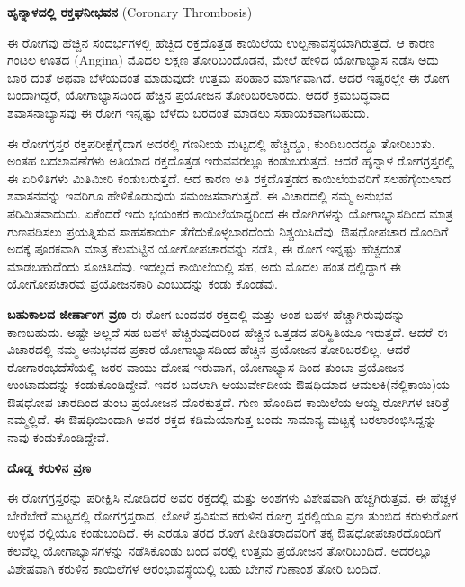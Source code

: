 \textbf{ಹೃನ್ನಾಳದಲ್ಲಿ ರಕ್ತಘನೀಭವನ} (Coronary Thrombosis)

ಈ ರೋಗವು ಹೆಚ್ಚಿನ ಸಂದರ್ಭಗಳಲ್ಲಿ ಹೆಚ್ಚಿದ ರಕ್ತದೊತ್ತಡ ಕಾಯಿಲೆಯ ಉಲ್ಬಣಾವಸ್ಥೆಯಾಗಿರುತ್ತದೆ. ಆ ಕಾರಣ ಗಂಟಲ ಊತದ (Angina) ಮೊದಲ ಲಕ್ಷಣ ತೋರಿಬಂದೊಡನೆ, ಮೇಲೆ ಹೇಳಿದ ಯೋಗಾಭ್ಯಾಸ ನಡೆಸಿ ಅದು ಬಾರ ದಂತೆ ಅಥವಾ ಬೆಳೆಯದಂತೆ ಮಾಡುವುದೇ ಉತ್ತಮ ಪರಿಹಾರ ಮಾರ್ಗವಾಗಿದೆ. ಆದರೆ ಇಷ್ಟರಲ್ಲೇ ಈ ರೋಗ ಬಂದಾಗಿದ್ದರೆ, ಯೋಗಾಭ್ಯಾಸದಿಂದ ಹೆಚ್ಚಿನ ಪ್ರಯೋಜನ ತೋರಿಬರಲಾರದು. ಆದರೆ ಕ್ರಮಬದ್ಧವಾದ ಶವಾಸನಾಭ್ಯಾಸವು ಈ ರೋಗ ಇನ್ನಷ್ಟು ಬೆಳೆದು ಬರದಂತೆ ಮಾಡಲು ಸಹಾಯಕವಾಗಬಹುದು.

ಈ ರೋಗಗ್ರಸ್ತರ ರಕ್ತಪರೀಕ್ಷೆಗೈದಾಗ ಅದರಲ್ಲಿ  ಗಣನೀಯ ಮಟ್ಟದಲ್ಲಿ ಹೆಚ್ಚಿದ್ದೂ,  ಕುಂದಿಬಂದದ್ದೂ ತೋರಿಬಂತು. ಅಂತಹ  ಬದಲಾವಣೆಗಳು ಅತಿಯಾದ ರಕ್ತದೊತ್ತಡ ಇರುವವರಲ್ಲೂ ಕಂಡುಬರುತ್ತದೆ. ಆದರೆ ಹೃನ್ನಾಳ ರೋಗಗ್ರಸ್ತರಲ್ಲಿ  ಈ ಏರಿಳಿತಿಗಳು ಮಿತಿಮೀರಿ ಕಂಡುಬರುತ್ತದೆ. ಆದ ಕಾರಣ ಅತಿ ರಕ್ತದೊತ್ತಡದ ಕಾಯಿಲೆಯವರಿಗೆ ಸಲಹೆಗೈಯಲಾದ ಶವಾಸನವನ್ನು ಇವರಿಗೂ ಹೇಳಿಕೊಡುವುದು ಸಮಂಜಸವಾಗುತ್ತದೆ. ಈ ವಿಚಾರದಲ್ಲಿ ನಮ್ಮ ಅನುಭವ ಪರಿಮಿತವಾದುದು. ಏಕೆಂದರೆ ಇದು ಭಯಂಕರ ಕಾಯಿಲೆಯಾದ್ದರಿಂದ ಈ ರೋಗಿಗಳನ್ನು ಯೋಗಾಭ್ಯಾಸದಿಂದ ಮಾತ್ರ ಗುಣಪಡಿಸಲು ಪ್ರಯತ್ನಿಸುವ ಸಾಹಸಕಾರ್ಯ ತೆಗೆದುಕೊಳ್ಳಬಾರದೆಂದು ನಿಶ್ಚಯಿಸಿದೆವು. ಔಷಧೋಪಚಾರ ದೊಂದಿಗೆ ಅದಕ್ಕೆ ಪೂರಕವಾಗಿ ಮಾತ್ರ ಕೆಲಮಟ್ಟಿನ ಯೋಗೋಪಚಾರವನ್ನು ನಡೆಸಿ, ಈ ರೋಗ ಇನ್ನಷ್ಟು ಹೆಚ್ಚದಂತೆ ಮಾಡಬಹುದೆಂದು ಸೂಚಿಸಿದೆವು. ಇದಲ್ಲದೆ  ಕಾಯಿಲೆಯಲ್ಲಿ ಸಹ, ಅದು ಮೊದಲ ಹಂತ ದಲ್ಲಿದ್ದಾಗ ಈ ಯೋಗೋಪಚಾರವು ಪ್ರಯೋಜನಕಾರಿ ಎಂಬುದನ್ನು ಕಂಡು ಕೊಂಡೆವು.

\textbf{ಬಹುಕಾಲದ ಜೀರ್ಣಾಂಗ ವ್ರಣ}  ಈ ರೋಗ ಬಂದವರ ರಕ್ತದಲ್ಲಿ  ಮತ್ತು  ಅಂಶ ಬಹಳ ಹೆಚ್ಚಾಗಿರುವುದನ್ನು ಕಾಣಬಹುದು. ಅಷ್ಟೇ ಅಲ್ಲದೆ  ಸಹ ಬಹಳ ಹೆಚ್ಚಿರುವುದರಿಂದ ಹೆಚ್ಚಿನ ಒತ್ತಡದ ಪರಿಸ್ಥಿತಿಯೂ ಇರುತ್ತದೆ. ಆದರೆ ಈ ವಿಚಾರದಲ್ಲಿ ನಮ್ಮ ಅನುಭವದ ಪ್ರಕಾರ ಯೋಗಾಭ್ಯಾಸದಿಂದ ಹೆಚ್ಚಿನ ಪ್ರಯೋಜನ ತೋರಿಬರಲಿಲ್ಲ. ಆದರೆ ರೋಗಾರಂಭದೆಸೆಯಲ್ಲಿ ಜಠರ ವಾಯು ದೋಷ  ಇರುವಾಗ, ಯೋಗಾಭ್ಯಾಸ ದಿಂದ ತುಂಬಾ ಪ್ರಯೋಜನ ಉಂಟಾದುದನ್ನು ಕಂಡುಕೊಂಡಿದ್ದೇವೆ. ಇದರ ಬದಲಾಗಿ ಆಯುರ್ವೇದೀಯ ಔಷಧಿಯಾದ ಆಮಲಕಿ(ನೆಲ್ಲಿಕಾಯಿ)ಯ ಔಷಧೋಪ ಚಾರದಿಂದ ತುಂಬ ಪ್ರಯೋಜನ ದೊರಕುತ್ತದೆ. ಗುಣ ಹೊಂದಿದ  ಕಾಯಿಲೆಯ ಆಯ್ದ  ರೋಗಿಗಳ ಚರಿತ್ರೆ ನಮ್ಮಲ್ಲಿದೆ. ಈ ಔಷಧಿಯಿಂದಾಗಿ ಅವರ ರಕ್ತದ  ಕಡಿಮೆಯಾಗುತ್ತ ಬಂದು  ಸಾಮಾನ್ಯ ಮಟ್ಟಕ್ಕೆ ಬರಲಾರಂಭಿಸಿದ್ದನ್ನು ನಾವು ಕಂಡುಕೊಂಡಿದ್ದೇವೆ.

\textbf{ದೊಡ್ಡ ಕರುಳಿನ ವ್ರಣ} 

ಈ ರೋಗಗ್ರಸ್ತರನ್ನು ಪರೀಕ್ಷಿಸಿ ನೋಡಿದರೆ ಅವರ ರಕ್ತದಲ್ಲಿ  ಮತ್ತು  ಅಂಶಗಳು ವಿಶೇಷವಾಗಿ ಹೆಚ್ಚಗಿರುತ್ತವೆ. ಈ ಹೆಚ್ಚಳ ಬೇರೆಬೇರೆ ಮಟ್ಟದಲ್ಲಿ ರೋಗಗ್ರಸ್ತರಾದ, ಲೋಳೆ ಸ್ರವಿಸುವ ಕರುಳಿನ ರೋಗ್ರ ಸ್ತರಲ್ಲಿಯೂ  ವ್ರಣ ತುಂಬಿದ ಕರುಳುರೋಗ ಉಳ್ಳವ ರಲ್ಲಿಯೂ ಕಂಡುಬಂದಿದೆ. ಈ ಎರಡೂ ತರದ ರೋಗ ಪೀಡಿತರಾದವರಿಗೆ ತಕ್ಕ ಔಷಧೋಪಚಾರದೊಂದಿಗೆ ಕೆಲವೆಲ್ಲ ಯೋಗಾಭ್ಯಾಸಗಳನ್ನು ನಡೆಸಿಕೊಂಡು ಬಂದ ವರಲ್ಲಿ ಉತ್ತಮ ಪ್ರಯೋಜನ ತೋರಿಬಂದಿದೆ. ಅದರಲ್ಲೂ ವಿಶೇಷವಾಗಿ ಕರುಳಿನ ಕಾಯಿಲೆಗಳ ಆರಂಭಾವಸ್ಥೆಯಲ್ಲಿ ಬಹು ಬೇಗನೆ ಗುಣಾಂಶ ತೋರಿ ಬಂದಿದೆ.

